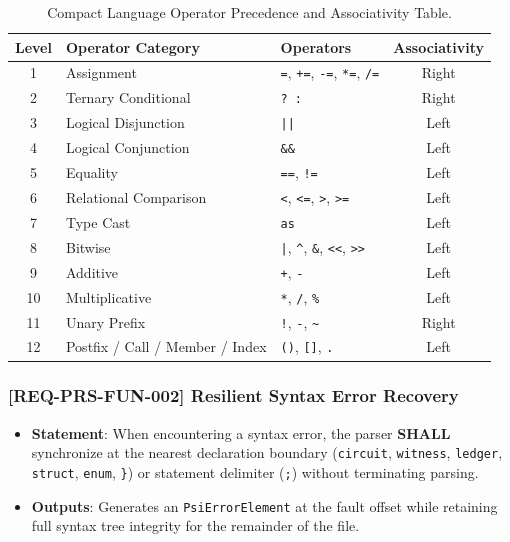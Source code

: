 \begin{table}[htbp]
    \centering
    \small
    \begin{tabular}{c l l c}
        \toprule
        \textbf{Level} & \textbf{Operator Category} & \textbf{Operators} & \textbf{Associativity} \\
        \midrule
        1 & Assignment & \texttt{=}, \texttt{+=}, \texttt{-=}, \texttt{*=}, \texttt{/=} & Right \\
        2 & Ternary Conditional & \texttt{? :} & Right \\
        3 & Logical Disjunction & \texttt{||} & Left \\
        4 & Logical Conjunction & \texttt{\&\&} & Left \\
        5 & Equality & \texttt{==}, \texttt{!=} & Left \\
        6 & Relational Comparison & \texttt{<}, \texttt{<=}, \texttt{>}, \texttt{>=} & Left \\
        7 & Type Cast & \texttt{as} & Left \\
        8 & Bitwise & \texttt{|}, \texttt{\^{}}, \texttt{\&}, \texttt{<<}, \texttt{>>} & Left \\
        9 & Additive & \texttt{+}, \texttt{-} & Left \\
        10 & Multiplicative & \texttt{*}, \texttt{/}, \texttt{\%} & Left \\
        11 & Unary Prefix & \texttt{!}, \texttt{-}, \texttt{\~{}} & Right \\
        12 & Postfix / Call / Member / Index & \texttt{()}, \texttt{[]}, \texttt{.} & Left \\
        \bottomrule
    \end{tabular}
    \caption{Compact Language Operator Precedence and Associativity Table.}
    \label{tab:precedence}
\end{table}

\subsubsection{[REQ-PRS-FUN-002] Resilient Syntax Error Recovery}
\begin{itemize}
    \item \textbf{Statement}: When encountering a syntax error, the parser \textbf{SHALL} synchronize at the nearest declaration boundary (\texttt{circuit}, \texttt{witness}, \texttt{ledger}, \texttt{struct}, \texttt{enum}, \texttt{\}}) or statement delimiter (\texttt{;}) without terminating parsing.
    \item \textbf{Outputs}: Generates an \texttt{PsiErrorElement} at the fault offset while retaining full syntax tree integrity for the remainder of the file.
\end{itemize}

